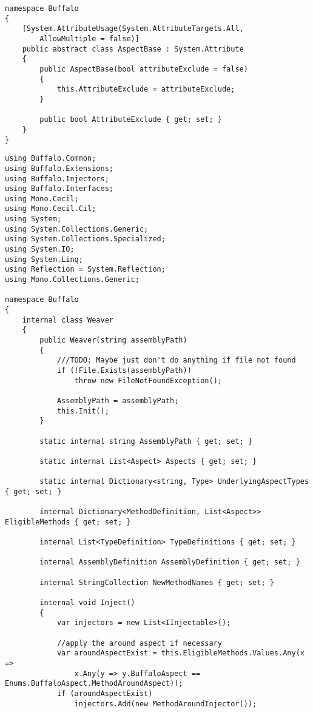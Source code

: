 \begin{lstlisting}[caption={../buffalo/AspectBase.cs}, label=../buffalo/AspectBase.cs, frame=tb, basicstyle=\scriptsize]﻿namespace Buffalo
{
    [System.AttributeUsage(System.AttributeTargets.All,
        AllowMultiple = false)]
    public abstract class AspectBase : System.Attribute
    {
        public AspectBase(bool attributeExclude = false)
        {
            this.AttributeExclude = attributeExclude;
        }

        public bool AttributeExclude { get; set; }
    }
}
\end{lstlisting}

\begin{lstlisting}[caption={../buffalo/Weaver.cs}, label=../buffalo/Weaver.cs, frame=tb, basicstyle=\scriptsize]﻿using Buffalo.Common;
using Buffalo.Extensions;
using Buffalo.Injectors;
using Buffalo.Interfaces;
using Mono.Cecil;
using Mono.Cecil.Cil;
using System;
using System.Collections.Generic;
using System.Collections.Specialized;
using System.IO;
using System.Linq;
using Reflection = System.Reflection;
using Mono.Collections.Generic;

namespace Buffalo
{
    internal class Weaver
    {
        public Weaver(string assemblyPath)
        {
            ///TODO: Maybe just don't do anything if file not found
            if (!File.Exists(assemblyPath))
                throw new FileNotFoundException();

            AssemblyPath = assemblyPath;
            this.Init();
        }

        static internal string AssemblyPath { get; set; }

        static internal List<Aspect> Aspects { get; set; }

        static internal Dictionary<string, Type> UnderlyingAspectTypes { get; set; }

        internal Dictionary<MethodDefinition, List<Aspect>> EligibleMethods { get; set; }

        internal List<TypeDefinition> TypeDefinitions { get; set; }

        internal AssemblyDefinition AssemblyDefinition { get; set; }

        internal StringCollection NewMethodNames { get; set; }

        internal void Inject()
        {
            var injectors = new List<IInjectable>();

            //apply the around aspect if necessary
            var aroundAspectExist = this.EligibleMethods.Values.Any(x => 
                x.Any(y => y.BuffaloAspect == Enums.BuffaloAspect.MethodAroundAspect));
            if (aroundAspectExist)
                injectors.Add(new MethodAroundInjector());


\end{lstlisting}
